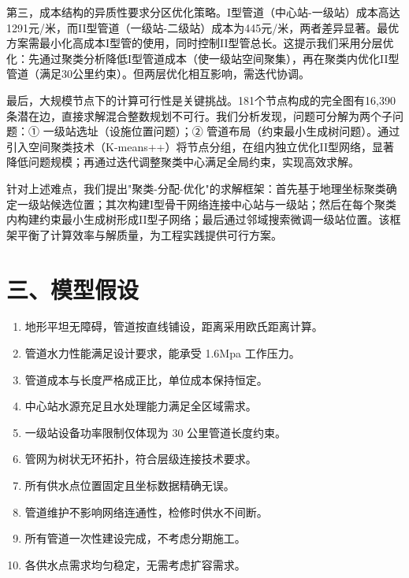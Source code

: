 \documentclass[12pt,a4paper]{article}
\begin{document}
第三，成本结构的异质性要求分区优化策略。I型管道（中心站-一级站）成本高达1291元/米，而II型管道（一级站-二级站）成本为445元/米，两者差异显著。最优方案需最小化高成本I型管的使用，同时控制II型管总长。这提示我们采用分层优化：先通过聚类分析降低I型管道成本（使一级站空间聚集），再在聚类内优化II型管道（满足30公里约束）。但两层优化相互影响，需迭代协调。

最后，大规模节点下的计算可行性是关键挑战。181个节点构成的完全图有16,390条潜在边，直接求解混合整数规划不可行。我们分析发现，问题可分解为两个子问题：① 一级站选址（设施位置问题）；② 管道布局（约束最小生成树问题）。通过引入空间聚类技术（K-means++）将节点分组，在组内独立优化II型网络，显著降低问题规模；再通过迭代调整聚类中心满足全局约束，实现高效求解。

针对上述难点，我们提出"聚类-分配-优化"的求解框架：首先基于地理坐标聚类确定一级站候选位置；其次构建I型骨干网络连接中心站与一级站；然后在每个聚类内构建约束最小生成树形成II型子网络；最后通过邻域搜索微调一级站位置。该框架平衡了计算效率与解质量，为工程实践提供可行方案。

\section*{\centering 三、模型假设}
\begin{enumerate}[label=\arabic*., leftmargin=2em, itemindent=0pt, itemsep=0.5ex, parsep=0.5ex]
  \item 地形平坦无障碍，管道按直线铺设，距离采用欧氏距离计算。
  \item 管道水力性能满足设计要求，能承受 1.6Mpa 工作压力。
  \item 管道成本与长度严格成正比，单位成本保持恒定。
  \item 中心站水源充足且水处理能力满足全区域需求。
  \item 一级站设备功率限制仅体现为 30 公里管道长度约束。
  \item 管网为树状无环拓扑，符合层级连接技术要求。
  \item 所有供水点位置固定且坐标数据精确无误。
  \item 管道维护不影响网络连通性，检修时供水不间断。
  \item 所有管道一次性建设完成，不考虑分期施工。
  \item 各供水点需求均匀稳定，无需考虑扩容需求。
\end{enumerate}
\end{document}
